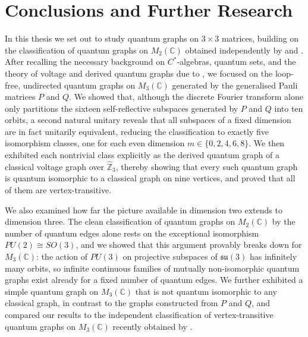\chapter{Conclusions and Further Research}

In this thesis we set out to study quantum graphs on \( 3 \times 3 \)
matrices, building on the classification of quantum graphs on
\( M_2 (\mathbb{C}) \) obtained independently by \textcite{matsuda22} and
\textcite{gromada22}. After recalling the necessary background on
\( C^{*} \)-algebras, quantum sets, and the theory of voltage and
derived quantum graphs due to \textcite{tobolski26}, we focused on the
loop-free, undirected quantum graphs on \( M_3 (\mathbb{C}) \) generated by the
generalised Pauli matrices \( P \) and \( Q \). We showed that,
although the discrete Fourier transform alone only partitions the
sixteen self-reflective subspaces generated by \( P \) and \( Q \)
into ten orbits, a second natural unitary reveals that all subspaces
of a fixed dimension are in fact unitarily equivalent, reducing the
classification to exactly five isomorphism classes, one for each
even dimension \( m \in \{0,2,4,6,8\} \). We then exhibited each
nontrivial class explicitly as the derived quantum graph of a
classical voltage graph over \( \widehat{\mathbb{Z}}_3 \), thereby showing that
every such quantum graph is quantum isomorphic to a classical graph on
nine vertices, and proved that all of them are vertex-transitive.

We also examined how far the picture available in dimension two
extends to dimension three. The clean classification of quantum
graphs on \( M_2 (\mathbb{C}) \) by the number of quantum edges alone
rests on the
exceptional isomorphism \( PU(2) \cong SO(3) \), and we showed that
this argument provably breaks down for \( M_3 (\mathbb{C}) \): the action of
\( PU(3) \) on projective subspaces of \( \mathfrak{su}(3) \) has
infinitely many orbits, so infinite continuous families of mutually
non-isomorphic quantum graphs exist already for a fixed number of
quantum edges. We further exhibited a simple quantum graph on \( M_3
(\mathbb{C}) \)
that is not quantum isomorphic to any classical graph, in contrast to
the graphs constructed from \( P \) and \( Q \), and compared our
results to the independent classification of vertex-transitive
quantum graphs on \( M_3 (\mathbb{C}) \) recently obtained by
\textcite{hayes26}.

